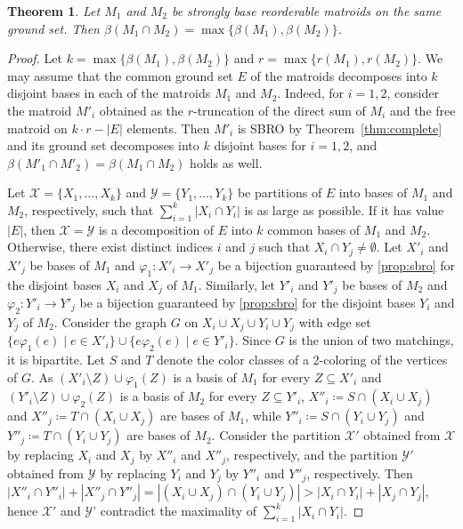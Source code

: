 \documentclass[11pt,a4paper]{article}
\theoremstyle{plain}
\newtheorem{thm}{Theorem}
\theoremstyle{definition}
\begin{document}
\begin{thm}\label{thm:sbro} Let $M_1$ and $M_2$ be strongly base reorderable matroids on the same ground set. Then $\beta(M_1\cap M_2) = \max\{\beta(M_1),\beta(M_2)\}$.
\end{thm}
\begin{proof}
Let $k = \max \{\beta(M_1), \beta(M_2)\}$ and $r = \max\{r(M_1), r(M_2)\}$. We may assume that the common ground set $E$ of the matroids decomposes into $k$ disjoint bases in each of the matroids $M_1$ and $M_2$. Indeed, for $i=1,2$, consider the matroid $M'_i$ obtained as the $r$-truncation of the direct sum of $M_i$ and the free matroid on $k\cdot r-|E|$ elements. Then $M'_i$ is SBRO by Theorem~\ref{thm:complete} and its ground set decomposes into $k$ disjoint bases for $i=1,2$,  and $\beta(M'_1 \cap M'_2) = \beta(M_1 \cap M_2)$ holds as well.

Let $\mathcal{X} = \{X_1, \dots, X_k\}$ and $\mathcal{Y} = \{Y_1, \dots, Y_k\}$ be partitions of $E$ into bases of $M_1$ and $M_2$, respectively, such that $\sum_{i=1}^k |X_i \cap Y_i|$ is as large as possible. If it has value $|E|$, then $\mathcal{X} = \mathcal{Y}$ is a decomposition of $E$ into $k$ common bases of $M_1$ and $M_2$. Otherwise, there exist distinct indices $i$ and $j$ such that $X_i \cap Y_j \ne \emptyset$. 
Let $X'_i$ and $X'_j$ be bases of $M_1$ and $\varphi_1\colon X'_i \to X'_j$ be a bijection guaranteed by \ref{prop:sbro} for the disjoint bases $X_i$ and $X_j$ of $M_1$. Similarly, let $Y'_i$ and $Y'_j$ be bases of $M_2$ and $\varphi_2\colon Y'_i \to Y'_j$ be a bijection guaranteed by \ref{prop:sbro} for the disjoint bases $Y_i$ and $Y_j$ of $M_2$. Consider the graph $G$ on $X_i \cup X_j \cup Y_i \cup Y_j$ with edge set $\{e\varphi_1(e) \mid e \in X'_i\} \cup \{e\varphi_2(e) \mid e \in Y'_i\}$. Since $G$ is the union of two matchings, it is bipartite. Let $S$ and $T$ denote the color classes of a 2-coloring of the vertices of $G$. As $(X'_i \setminus Z) \cup \varphi_1(Z)$ is a basis of $M_1$ for every $Z \subseteq X'_i$ and $(Y'_i \setminus Z) \cup \varphi_2(Z)$ is a basis of $M_2$ for every $Z \subseteq Y'_i$, $X''_i \coloneqq S\cap (X_i \cup X_j)$ and $X''_j \coloneqq T \cap (X_i \cup X_j)$ are bases of $M_1$, while $Y''_i \coloneqq S \cap (Y_i \cup Y_j)$ and $Y''_j \coloneqq T \cap (Y_i \cup Y_j)$ are bases of $M_2$. Consider the partition $\mathcal{X}'$ obtained from $\mathcal{X}$ by replacing $X_i$ and $X_j$ by $X''_i$ and $X''_j$, respectively, and the partition $\mathcal{Y}'$ obtained from $\mathcal{Y}$ by replacing $Y_i$ and $Y_j$ by $Y''_i$ and $Y''_j$, respectively. Then $|X''_i \cap Y''_i| + |X''_j \cap Y''_j| = |(X_i \cup X_j) \cap (Y_i \cup Y_j)| > |X_i \cap Y_i|  + |X_j \cap Y_j|$, hence $\mathcal{X}'$ and $\mathcal{Y}$' contradict the maximality of $\sum_{i=1}^k |X_i \cap Y_i|$.
\end{proof}
\end{document}
